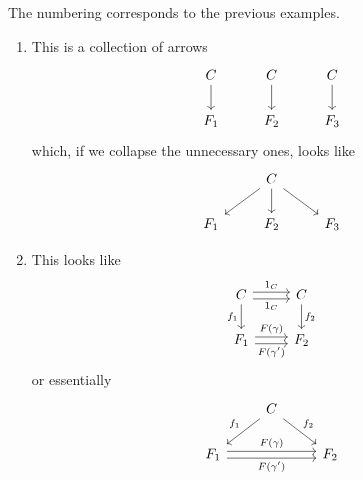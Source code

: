 \documentclass[12pt]{article}
\begin{document}
\begin{example}
	The numbering corresponds to the previous examples.
	\begin{enumerate}
		\item This is a collection of arrows 
		\begin{equation*}
\begin{tikzcd}
C \arrow[d] & C \arrow[d] & C \arrow[d] \\
F_1         & F_2         & F_3        
\end{tikzcd}
		\end{equation*}
		which, if we collapse the unnecessary ones, looks like 
		\begin{equation*}
\begin{tikzcd}
    & C \arrow[d] \arrow[ld] \arrow[rd] &     \\
F_1 & F_2                               & F_3
\end{tikzcd}
		\end{equation*}

	\item This looks like 
		\begin{equation*}
\begin{tikzcd}
C \arrow[r, "1_C", shift left] \arrow[r, "1_C"', shift right] \arrow[d, "f_1"'] & C \arrow[d, "f_2"] \\
F_1 \arrow[r, "F(\gamma)", shift left] \arrow[r, "F(\gamma')"', shift right]    & F_2               
\end{tikzcd}
		\end{equation*}
		or essentially 
		\begin{equation*}
\begin{tikzcd}
                                                                               & C \arrow[ld, "f_1"'] \arrow[rd, "f_2"] &     \\
F_1 \arrow[rr, "F(\gamma)", shift left] \arrow[rr, "F(\gamma')"', shift right] &                                        & F_2
\end{tikzcd}
		\end{equation*}


\end{enumerate}
\end{example}
\end{document}
